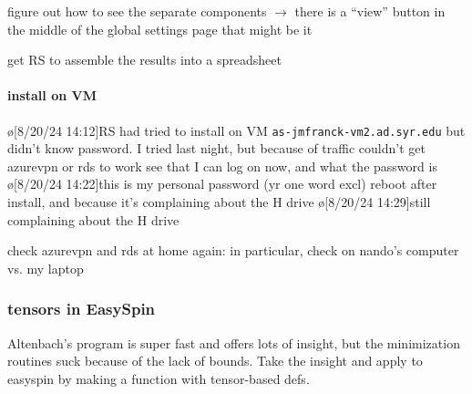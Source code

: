 figure out how to see the separate components $\rightarrow$  there is a ``view'' button in the middle of the global settings page that might be it

get RS to assemble the results into a spreadsheet

\paragraph{install on VM}
\o[8/20/24 14:12]{RS had tried to install on VM \texttt{as-jmfranck-vm2.ad.syr.edu} but didn't know password. I tried last night, but because of traffic couldn't get azurevpn or rds to work}
see that I can log on now, and what the password is
\o[8/20/24 14:22]{this is my personal password (yr one word excl)}
reboot after install, and because it's complaining about the H drive
\o[8/20/24 14:29]{still complaining about the H drive}

check azurevpn and rds at home again: in particular, check on nando's computer vs. my laptop

\subsubsection{tensors in EasySpin}\label{sec:EasySpinTensor}
Altenbach's program is super fast and offers lots of insight, but the minimization routines suck because of the lack of bounds.
Take the insight and apply to easyspin by making a function with tensor-based defs.

